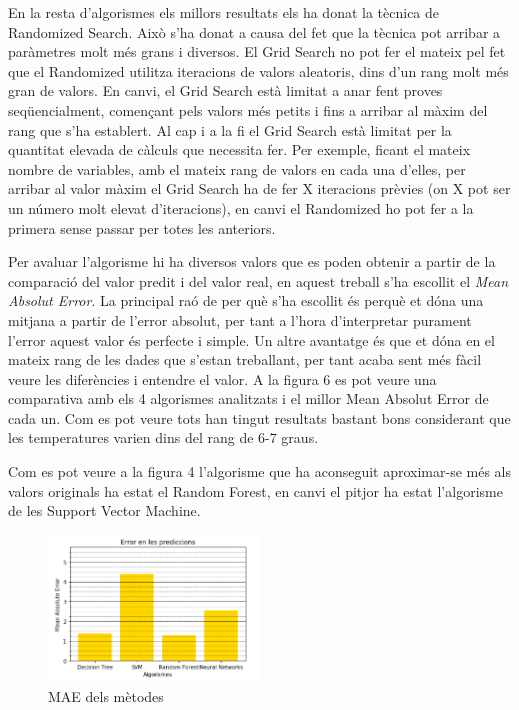 \documentclass[10pt,a4paper,twocolumn,twoside]{article}
\begin{document}
En la resta d'algorismes els millors resultats els ha donat la tècnica de Randomized Search. Això s'ha donat a causa del fet que la tècnica pot arribar a paràmetres molt més grans i diversos. El Grid Search no pot fer el mateix pel fet que el Randomized utilitza iteracions de valors aleatoris, dins d'un rang molt més gran de valors. En canvi, el Grid Search està limitat a anar fent proves seqüencialment, començant pels valors més petits i fins a arribar al màxim del rang que s'ha establert. Al cap i a la fi el Grid Search està limitat per la quantitat elevada de càlculs que necessita fer. Per exemple, ficant el mateix nombre de variables, amb el mateix rang de valors en cada una d'elles, per arribar al valor màxim el Grid Search ha de fer X iteracions prèvies (on X pot ser un número molt elevat d'iteracions), en canvi el Randomized ho pot fer a la primera sense passar per totes les anteriors.

Per avaluar l'algorisme hi ha diversos valors que es poden obtenir a partir de la comparació del valor predit i del valor real, en aquest treball s'ha escollit el \textit{Mean Absolut Error}. La principal raó de per què s'ha escollit és perquè et dóna una mitjana a partir de l'error absolut, per tant a l'hora d'interpretar purament l'error aquest valor és perfecte i simple. Un altre avantatge és que et dóna en el mateix rang de les dades que s'estan treballant, per tant acaba sent més fàcil veure les diferències i entendre el valor. A la figura 6 es pot veure una comparativa amb els 4 algorismes analitzats i el millor Mean Absolut Error de cada un. Com es pot veure tots han tingut resultats bastant bons considerant que les temperatures varien dins del rang de 6-7 graus.

Com es pot veure a la figura 4 l'algorisme que ha aconseguit aproximar-se més als valors originals ha estat el Random Forest, en canvi el pitjor ha estat l'algorisme de les Support Vector Machine.
\begin{figure}[!h]
\centering
	\includegraphics[width=0.5\textwidth]{../img/comparacioMetricsAlgs}
	\caption{MAE dels mètodes}
	\label{fig-Metrics}
\end{figure}
\end{document}
